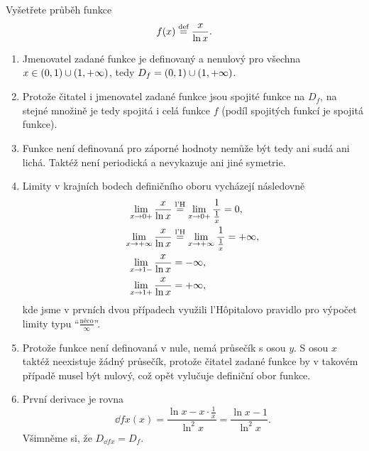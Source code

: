 \documentclass[answers]{exam}
\begin{document}
\begin{questions}
  \question[4] Vyšetřete průběh funkce
  \begin{equation*}
    f(x) \stackrel{\text{def}}{=} \frac{x}{\ln x}.
  \end{equation*}
  
  \begin{solution}
    \begin{enumerate}
    	\item Jmenovatel zadané funkce je definovaný a nenulový pro všechna $x \in \parens{0, 1} \cup \parens{1, +\infty}$, tedy $D_f = \parens{0, 1} \cup \parens{1, +\infty}$.
    	
    	\item Protože čitatel i jmenovatel zadané funkce jsou spojité funkce na $D_f$, na stejné množině je tedy spojitá i celá funkce $f$ (podíl spojitých funkcí je spojitá funkce).
    	
    	\item Funkce není definovaná pro záporné hodnoty nemůže být tedy ani sudá ani lichá. Taktéž není periodická a nevykazuje ani jiné symetrie.
    	
    	\item \label{item:4}
    		Limity v krajních bodech definičního oboru vycházejí následovně
    		\begin{align*}
    			\lim_{x \to 0+} \frac{x}{\ln x}
    			&\stackrel{\text{l'H}}{=}
    			\lim_{x \to 0+} \frac{1}{\frac{1}{x}}
    			=
    			0,
    			\\
    			\lim_{x \to +\infty} \frac{x}{\ln x}
    			&\stackrel{\text{l'H}}{=}
    			\lim_{x \to +\infty} \frac{1}{\frac{1}{x}}
    			=
    			+\infty,
    			\\
    			\lim_{x \to 1-} \frac{x}{\ln x}
    			&= - \infty,
    			\\
    			\lim_{x \to 1+} \frac{x}{\ln x}
    			&= + \infty,
    		\end{align*}
    		kde jsme v prvních dvou případech využili l'Hôpitalovo pravidlo pro výpočet limity typu ``$\frac{\textrm{něco}}{\infty}$''.
    	\item 
    		Protože funkce není definovaná v nule, nemá průsečík s osou $y$. S osou $x$ taktéž neexistuje žádný průsečík, protože čitatel zadané funkce by v takovém případě musel být nulový, což opět vylučuje definiční obor funkce.
    		
    		\item První derivace je rovna
    			\begin{equation*}
    				\dd{f}{x}(x)
    				=
    				\frac{\ln x - x \cdot \frac{1}{x}}{\ln^2 x}
    				=
    				\frac{\ln x - 1}{\ln^2 x}.
    			\end{equation*}
    			Všimněme si, že $D_{\dd{f}{x}} = D_f$.
					

\end{enumerate}
\end{solution}
\end{questions}
\end{document}
